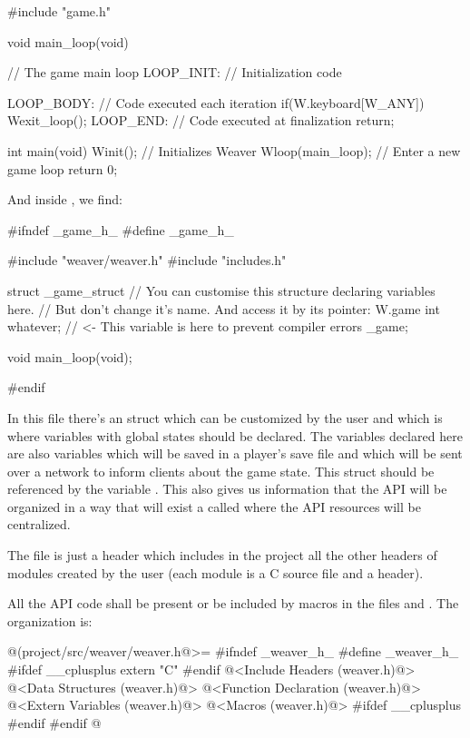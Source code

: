 \alinhaverbatim
#include "game.h"

void main_loop(void){ // The game main loop
 LOOP_INIT: // Initialization code 

 LOOP_BODY: // Code executed each iteration
    if(W.keyboard[W_ANY])
        Wexit_loop();
 LOOP_END: // Code executed at finalization
    return;
}

int main(void){
  Winit(); // Initializes Weaver
  Wloop(main_loop); // Enter a new game loop
  return 0;
}
\alinhanormal

And inside , we find:

\alinhaverbatim
#ifndef _game_h_
#define _game_h_

#include "weaver/weaver.h"
#include "includes.h"

struct _game_struct{
  // You can customise this structure declaring variables here.
  // But don't change it's name. And access it by its pointer: W.game
  int whatever; // <- This variable is here to prevent compiler errors
} _game;

void main_loop(void);

#endif
\alinhanormal

In this file there's an struct which can be customized by the user and
which is where variables with global states should be declared. The
variables declared here are also variables which will be saved in a
player's save file and which will be sent over a network to inform
clients about the game state. This struct should be referenced by the
variable . This also gives us information that the
API will be organized in a way that will exist a 
called  where the API resources will be centralized.

The file  is just a header which includes in
the project all the other headers of modules created by the user (each
module is a C source file and a header).

All the API code shall be present or be included by macros in the
files  and . The
 organization is:

\iniciocodigo
@(project/src/weaver/weaver.h@>=
#ifndef _weaver_h_
#define _weaver_h_
#ifdef __cplusplus
  extern "C" {
#endif
@<Include Headers (weaver.h)@>
@<Data Structures (weaver.h)@>
@<Function Declaration (weaver.h)@>
@<Extern Variables (weaver.h)@>
@<Macros (weaver.h)@>
#ifdef __cplusplus
  }
#endif
#endif
@
\fimcodigo

